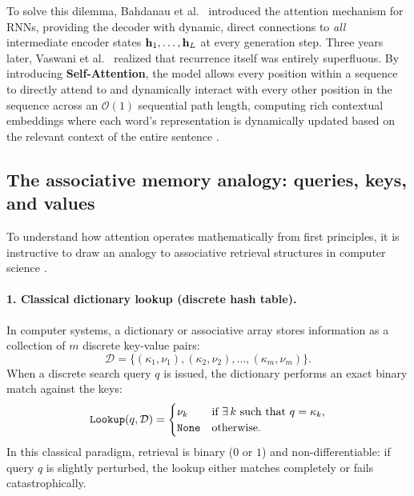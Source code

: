 \documentclass[../../main.tex]{subfiles}
\begin{document}
To solve this dilemma, Bahdanau et al.~\cite{bahdanau2014} introduced the attention mechanism for RNNs, providing the decoder with dynamic, direct connections to \emph{all} intermediate encoder states $\mathbf{h}_1, \dots, \mathbf{h}_L$ at every generation step.
Three years later, Vaswani et al.~\cite{vaswani2017} realized that recurrence itself was entirely superfluous. By introducing \textbf{Self-Attention}, the model allows every position within a sequence to directly attend to and dynamically interact with every other position in the sequence across an $\mathcal{O}(1)$ sequential path length, computing rich contextual embeddings where each word's representation is dynamically updated based on the relevant context of the entire sentence \cite{raschka2024llm}.

\subsection{The associative memory analogy: queries, keys, and values}
\label{subsec:associative_memory_analogy}

To understand how attention operates mathematically from first principles, it is instructive to draw an analogy to associative retrieval structures in computer science \cite{jurafsky2024, sanderson2024attention}.

\paragraph{1. Classical dictionary lookup (discrete hash table).}
In computer systems, a dictionary or associative array stores information as a collection of $m$ discrete key-value pairs:
\begin{equation}
\mathcal{D} = \{ (\kappa_1, \nu_1), (\kappa_2, \nu_2), \dots, (\kappa_m, \nu_m) \}.
\end{equation}
When a discrete search query $q$ is issued, the dictionary performs an exact binary match against the keys:
\begin{equation}
\label{eq:discrete_lookup}
\text{\texttt{Lookup}}(q, \mathcal{D}) = \begin{cases}
\nu_k & \text{if } \exists\, k \text{ such that } q = \kappa_k, \\
\text{\texttt{None}} & \text{otherwise}.
\end{cases}
\end{equation}
In this classical paradigm, retrieval is binary ($0$ or $1$) and non-differentiable: if query $q$ is slightly perturbed, the lookup either matches completely or fails catastrophically.
\end{document}

